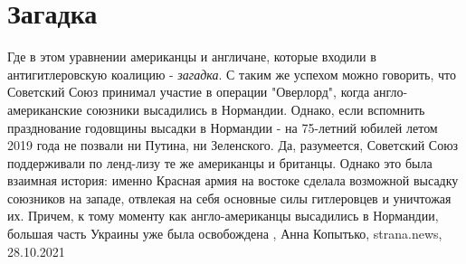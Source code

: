  
 
 
 
 
\chapter{Загадка}
\label{sec:slova.zagadka}

Где в этом уравнении американцы и англичане, которые входили в антигитлеровскую
коалицию - \emph{загадка}. С таким же успехом можно говорить, что Советский Союз
принимал участие в операции "Оверлорд", когда англо-американские союзники
высадились в Нормандии.  Однако, если вспомнить празднование годовщины высадки
в Нормандии - на 75-летний юбилей летом 2019 года не позвали ни Путина, ни
Зеленского.  Да, разумеется, Советский Союз поддерживали по ленд-лизу те же
американцы и британцы. Однако это была взаимная история: именно Красная армия
на востоке сделала возможной высадку союзников на западе, отвлекая на себя
основные силы гитлеровцев и уничтожая их.  Причем, к тому моменту как
англо-американцы высадились в Нормандии, большая часть Украины уже была
освобождена
, 
Анна Копытько, strana.news, 28.10.2021
